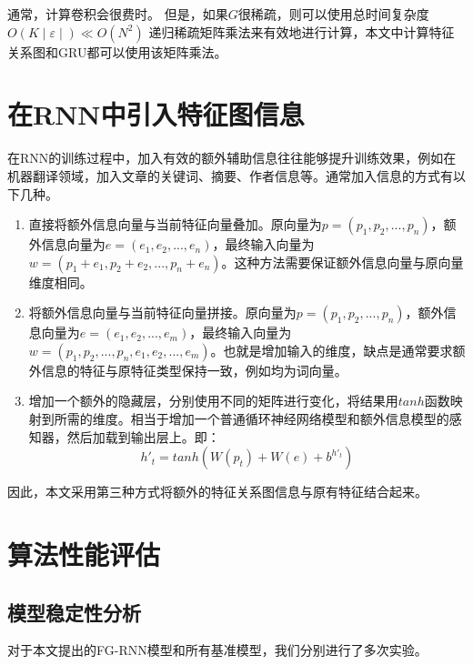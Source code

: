 通常，计算卷积会很费时。 但是，如果$G$很稀疏，则可以使用总时间复杂度 $O(K \mid \varepsilon \mid) \ll O(N^ 2)$ 递归稀疏矩阵乘法来有效地进行计算，本文中计算特征关系图和GRU都可以使用该矩阵乘法。



\section{在RNN中引入特征图信息}
在RNN的训练过程中，加入有效的额外辅助信息往往能够提升训练效果，例如在机器翻译领域，加入文章的关键词、摘要、作者信息等。通常加入信息的方式有以下几种。

\begin{enumerate}
  \item 直接将额外信息向量与当前特征向量叠加。原向量为$p=(p_1,p_2,...,p_n)$，额外信息向量为$e=(e_1,e_2,...,e_n)$，最终输入向量为$w=(p_1+e_1,p_2+e_2,...,p_n+e_n)$。这种方法需要保证额外信息向量与原向量维度相同。
  \item 将额外信息向量与当前特征向量拼接。原向量为$p=(p_1,p_2,...,p_n)$，额外信息向量为$e=(e_1,e_2,...,e_m)$，最终输入向量为$w=(p_1,p_2,...,p_n,e_1,e_2,...,e_m)$。也就是增加输入的维度，缺点是通常要求额外信息的特征与原特征类型保持一致，例如均为词向量。
  \item 增加一个额外的隐藏层，分别使用不同的矩阵进行变化，将结果用$tanh$函数映射到所需的维度。相当于增加一个普通循环神经网络模型和额外信息模型的感知器，然后加载到输出层上。即：
  \begin{equation}
    h'_t= tanh(W(p_t) + W(e) + b^{h'_t})
  \end{equation}
\end{enumerate}
因此，本文采用第三种方式将额外的特征关系图信息与原有特征结合起来。

\section{算法性能评估}
\subsection{模型稳定性分析}
对于本文提出的FG-RNN模型和所有基准模型，我们分别进行了多次实验。

